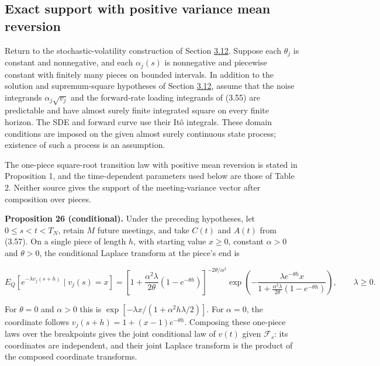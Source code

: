 \documentclass[11pt]{article}
\begin{document}
\subsection{Exact support with positive variance mean reversion}\label{sec:3.23}

Return to the stochastic-volatility construction of Section \hyperref[sec:3.12]{3.12}. Suppose each \(\theta_j\) is constant and nonnegative, and each \(\alpha_j(s)\) is nonnegative and piecewise constant with finitely many pieces on bounded intervals. In addition to the solution and supremum-square hypotheses of Section \hyperref[sec:3.12]{3.12}, assume that the noise integrands \(\alpha_j\sqrt{v_j}\) and the forward-rate loading integrands of (3.55) are predictable and have almost surely finite integrated square on every finite horizon. The SDE and forward curve use their Itô integrals. These domain conditions are imposed on the given almost surely continuous state process; existence of such a process is an assumption.

The one-piece square-root transition law with positive mean reversion is stated in \cite{malham2008square} Proposition 1, and the time-dependent parameters used below are those of \cite{brace2024sofr} Table 2. Neither source gives the support of the meeting-variance vector after composition over pieces.

\label{res:Proposition-26}
\textbf{Proposition 26 (conditional).} Under the preceding hypotheses, let \(0 \le s < t < T_N\), retain \(M\) future meetings, and take \(C(t)\) and \(A(t)\) from (3.57). On a single piece of length \(h\), with starting value \(x \ge 0\), constant \(\alpha > 0\) and \(\theta > 0\), the conditional Laplace transform at the piece's end is

\begin{equation*}
E_Q[e^{-\lambda v_j(s+h)}\mid v_j(s)=x]
= \left[1+\frac{\alpha^2\lambda}{2\theta}(1-e^{-\theta h})\right]^{-2\theta/\alpha^2}
\exp\!\left(-\frac{\lambda e^{-\theta h}x}{1+\frac{\alpha^2\lambda}{2\theta}(1-e^{-\theta h})}\right),\qquad \lambda\ge0. \tag{3.114}\label{eq:3.114}
\end{equation*}

For \(\theta=0\) and \(\alpha>0\) this is \(\exp[-\lambda x/(1+\alpha^2h\lambda/2)]\). For \(\alpha=0\), the coordinate follows \(v_j(s+h)=1+(x-1)e^{-\theta h}\). Composing these one-piece laws over the breakpoints gives the joint conditional law of \(v(t)\) given \(\mathcal F_s\): its coordinates are independent, and their joint Laplace transform is the product of the composed coordinate transforms.
\end{document}
